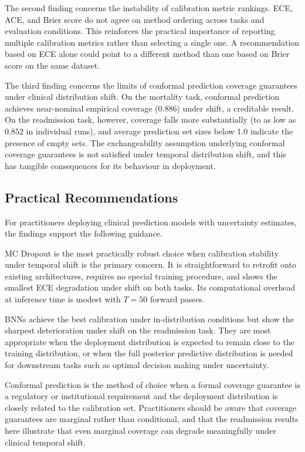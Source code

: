 \documentclass[11pt,a4paper]{article}
\begin{document}
The second finding concerns the instability of calibration metric rankings. ECE, ACE, and Brier score do not agree on method ordering across tasks and evaluation conditions. This reinforces the practical importance of reporting multiple calibration metrics rather than selecting a single one. A recommendation based on ECE alone could point to a different method than one based on Brier score on the same dataset.

The third finding concerns the limits of conformal prediction coverage guarantees under clinical distribution shift. On the mortality task, conformal prediction achieves near-nominal empirical coverage ($0.886$) under shift, a creditable result. On the readmission task, however, coverage falls more substantially (to as low as $0.852$ in individual runs), and average prediction set sizes below 1.0 indicate the presence of empty sets. The exchangeability assumption underlying conformal coverage guarantees is not satisfied under temporal distribution shift, and this has tangible consequences for its behaviour in deployment.

\subsection{Practical Recommendations}

For practitioners deploying clinical prediction models with uncertainty estimates, the findings support the following guidance.

MC Dropout is the most practically robust choice when calibration stability under temporal shift is the primary concern. It is straightforward to retrofit onto existing architectures, requires no special training procedure, and shows the smallest ECE degradation under shift on both tasks. Its computational overhead at inference time is modest with $T=50$ forward passes.

BNNs achieve the best calibration under in-distribution conditions but show the sharpest deterioration under shift on the readmission task. They are most appropriate when the deployment distribution is expected to remain close to the training distribution, or when the full posterior predictive distribution is needed for downstream tasks such as optimal decision making under uncertainty.

Conformal prediction is the method of choice when a formal coverage guarantee is a regulatory or institutional requirement and the deployment distribution is closely related to the calibration set. Practitioners should be aware that coverage guarantees are marginal rather than conditional, and that the readmission results here illustrate that even marginal coverage can degrade meaningfully under clinical temporal shift.
\end{document}
